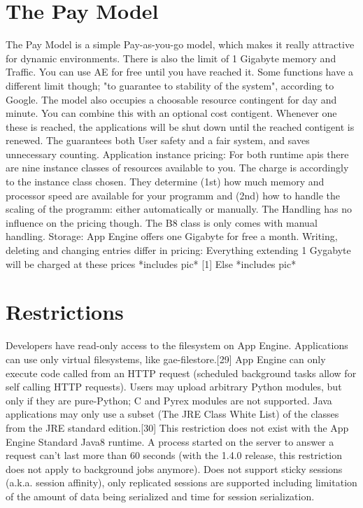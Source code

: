 \documentclass{article}
\begin{document}
\section{The Pay Model}
The Pay Model is a simple Pay-as-you-go model, which makes it really attractive for dynamic environments. There is also the limit of 1 Gigabyte memory and Traffic. You can use AE for free until you have reached it. Some functions have a different limit though; "to guarantee to stability of the system", according to Google. 
The model also occupies a choosable resource contingent for day and minute. You can combine this with an optional cost contigent. Whenever one these is reached, the applications will be shut down until the reached contigent is renewed. The guarantees both User safety and a fair system, and saves unnecessary counting.
Application instance pricing:
For both runtime apis there are nine instance classes of resources available to you. The charge is accordingly to the instance class chosen.
They determine  (1st) how much memory and processor speed are available for your programm and (2nd) how to handle the scaling of the programm: either automatically or manually. 
The Handling has no influence on the pricing though. 
The B8 class is only comes with manual handling.
Storage: App Engine offers one Gigabyte for free a month. Writing, deleting and changing entries differ in pricing: 
Everything extending 1 Gygabyte will be charged at these prices *includes pic* [1]
Else *includes pic*
\section{Restrictions}
    Developers have read-only access to the filesystem on App Engine. Applications can use only virtual filesystems, like gae-filestore.[29]
    App Engine can only execute code called from an HTTP request (scheduled background tasks allow for self calling HTTP requests).
    Users may upload arbitrary Python modules, but only if they are pure-Python; C and Pyrex modules are not supported.
    Java applications may only use a subset (The JRE Class White List) of the classes from the JRE standard edition.[30] This restriction does not exist with the App Engine Standard Java8 runtime.
    A process started on the server to answer a request can't last more than 60 seconds (with the 1.4.0 release, this restriction does not apply to background jobs anymore).
    Does not support sticky sessions (a.k.a. session affinity), only replicated sessions are supported including limitation of the amount of data being serialized and time for session serialization.
    
\end{document}

